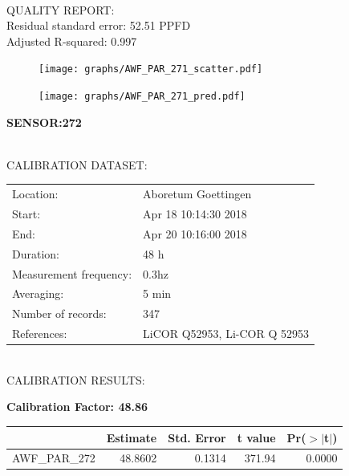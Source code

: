 \documentclass[oneside]{report}
\begin{document}
\hrulefill\\
QUALITY REPORT:\\
Residual standard error: 52.51 PPFD\\
Adjusted R-squared: 0.997



\begin{figure}[H]
  \centering
  \texttt{[image: graphs/AWF\_PAR\_271\_scatter.pdf]}
\end{figure}




\begin{figure}[H]
  \centering
  \texttt{[image: graphs/AWF\_PAR\_271\_pred.pdf]}
\end{figure}

\pagebreak


\begin{center}
\large{\textbf{SENSOR:272}}\\
\end{center}

\hrulefill\\
CALIBRATION DATASET:\\
\begin{table}[h!]
  \centering
  \label{tab:table1}
  \begin{tabular}{ll}
    Location: & Aboretum Goettingen\\ 
    
    
    Start:  & Apr 18 10:14:30 2018 \\
    End:   & Apr 20 10:16:00 2018\\ 
    Duration: & 48 h\\
    Measurement frequency: & 0.3hz\\
    Averaging:  &5 min\\
    Number of records: & 347 \\
    References: & LiCOR Q52953, Li-COR Q 52953 \\
  \end{tabular}
\end{table}

\hrulefill\\
CALIBRATION RESULTS:\\


\begin{center}
\textbf{\large{Calibration Factor: 48.86}}\\
\end{center}
\begin{table}[ht]
\centering
\begin{tabular}{rrrrr}
  \hline
 & Estimate & Std. Error & t value & Pr($>$$|$t$|$) \\ 
  \hline
AWF\_PAR\_272 & 48.8602 & 0.1314 & 371.94 & 0.0000 \\ 
   \hline
\end{tabular}
\end{table}
\end{document}
